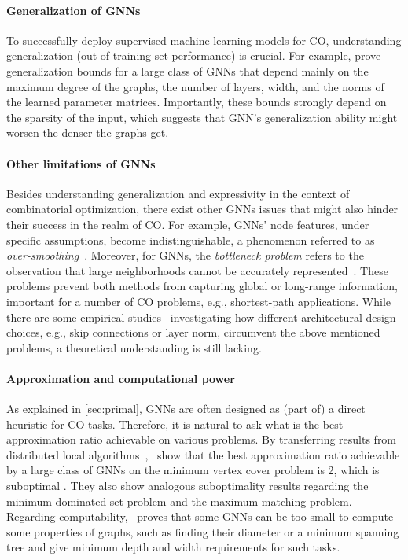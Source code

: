 \documentclass[twoside,11pt]{article}
\newcommand{\cm}[1]{{{\textcolor{orange}{\textbf{[CM:} {#1}\textbf{]}}}}}
\begin{document}
\paragraph{Generalization of GNNs}
To successfully deploy supervised machine learning models for CO, understanding generalization (out-of-training-set performance) is crucial. For example, \citet{Gar+2020} prove generalization bounds for a large class of GNNs that depend mainly on the maximum degree of the graphs, the number of layers, width, and the norms of the learned parameter matrices. Importantly, these bounds strongly depend on the sparsity of the input, which suggests that GNN's generalization ability might worsen the denser the graphs get.



\paragraph{Other limitations of GNNs}
Besides understanding generalization and expressivity in the context of combinatorial optimization, there exist other GNNs issues that might also hinder their success in the realm of CO. For example, GNNs' node features, under specific assumptions, become indistinguishable, a phenomenon referred to as \emph{over-smoothing}~\citep{Li2018}. Moreover, for GNNs, the \emph{bottleneck problem} refers to the observation that large neighborhoods cannot be accurately represented~\citep{Alon2020}. These problems prevent both methods from capturing global or long-range information, important for a number of CO problems, e.g., shortest-path applications. While there are some empirical studies~\citep{Dwivedi2020,You+2020b} investigating how different architectural design choices, e.g., skip connections or layer norm, circumvent the above mentioned problems, a theoretical understanding is still lacking.

\paragraph{Approximation and computational power}
As explained in \cref{sec:primal}, GNNs are often designed as (part of) a direct heuristic for CO tasks. Therefore, it is natural to ask what is the best {approximation ratio} achievable on various problems. By transferring results from distributed local algorithms~\citep{Suo+2013},~\citet{Sato2019} show that the best approximation ratio achievable by a large class of GNNs on the minimum vertex cover problem is 2, which is suboptimal \citep{karakostas2005better}. They also show analogous suboptimality results regarding the minimum dominated set problem and the maximum matching problem. Regarding computability,~\citet{Loukas2020} proves that some GNNs can be too small to compute some properties of graphs, such as finding their diameter or a minimum spanning tree and give minimum depth and width requirements for such tasks.
\end{document}
